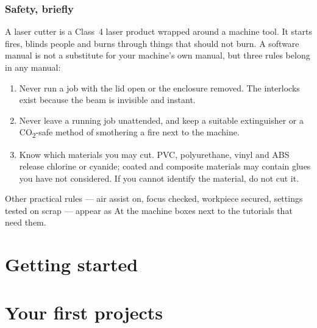 \documentclass[11pt,oneside]{book}
\begin{document}
\section*{Safety, briefly}

A laser cutter is a Class~4 laser product wrapped around a machine tool. It
starts fires, blinds people and burns through things that should not burn. A
software manual is not a substitute for your machine's own manual, but three
rules belong in any manual:

\begin{warnbox}
\begin{enumerate}[label=\arabic*.,leftmargin=1.4em]
  \item Never run a job with the lid open or the enclosure removed. The
        interlocks exist because the beam is invisible and instant.
  \item Never leave a running job unattended, and keep a suitable extinguisher
        or a CO\textsubscript{2}-safe method of smothering a fire next to the
        machine.
  \item Know which materials you may cut. PVC, polyurethane, vinyl and
        ABS release chlorine or cyanide; coated and composite materials may
        contain glues you have not considered. If you cannot identify the
        material, do not cut it.
\end{enumerate}
\end{warnbox}

\noindent Other practical rules --- air assist on, focus checked, workpiece
secured, settings tested on scrap --- appear as \textsf{At the machine} boxes next
to the tutorials that need them.

\tableofcontents

\mainmatter

\part{Getting started}





\part{Your first projects}




\end{document}
